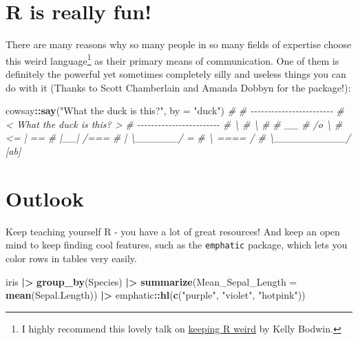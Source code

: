 \documentclass[
]{book}
\newenvironment{Shaded}{\begin{snugshade}}{\end{snugshade}}
\newcommand{\AttributeTok}[1]{\textcolor[rgb]{0.13,0.29,0.53}{#1}}
\newcommand{\CommentTok}[1]{\textcolor[rgb]{0.56,0.35,0.01}{\textit{#1}}}
\newcommand{\FunctionTok}[1]{\textcolor[rgb]{0.13,0.29,0.53}{\textbf{#1}}}
\newcommand{\NormalTok}[1]{#1}
\newcommand{\SpecialCharTok}[1]{\textcolor[rgb]{0.81,0.36,0.00}{\textbf{#1}}}
\newcommand{\StringTok}[1]{\textcolor[rgb]{0.31,0.60,0.02}{#1}}
\begin{document}
\section*{R is really fun!}\label{r-is-really-fun}

There are many reasons why so many people in so many fields of expertise choose this weird language\footnote{I highly recommend this lovely talk on \href{https://youtu.be/KOQBfC1WPwM?si=M_eStpWXBf56UGy7}{keeping R weird} by Kelly Bodwin.} as their primary means of communication.
One of them is definitely the powerful yet sometimes completely silly and useless things you can do with it (Thanks to Scott Chamberlain and Amanda Dobbyn for the package!):

\begin{Shaded}
\begin{Highlighting}[]
\NormalTok{cowsay}\SpecialCharTok{::}\FunctionTok{say}\NormalTok{(}\StringTok{"What the duck is this?"}\NormalTok{, }\AttributeTok{by =} \StringTok{"duck"}\NormalTok{)}
\CommentTok{\# }
\CommentTok{\#  {-}{-}{-}{-}{-}{-}{-}{-}{-}{-}{-}{-}{-}{-}{-}{-}{-}{-}{-}{-}{-}{-}{-}{-} }
\CommentTok{\# \textless{} What the duck is this? \textgreater{}}
\CommentTok{\#  {-}{-}{-}{-}{-}{-}{-}{-}{-}{-}{-}{-}{-}{-}{-}{-}{-}{-}{-}{-}{-}{-}{-}{-} }
\CommentTok{\#       \textbackslash{}}
\CommentTok{\#        \textbackslash{}}
\CommentTok{\# }
\CommentTok{\#          \_\_}
\CommentTok{\#         /o \textbackslash{}}
\CommentTok{\#       \textless{}=   |         ==}
\CommentTok{\#         |\_\_|        /===}
\CommentTok{\#         |   \textbackslash{}\_\_\_\_\_\_/  =}
\CommentTok{\#         \textbackslash{}     ====   /}
\CommentTok{\#          \textbackslash{}\_\_\_\_\_\_\_\_\_\_/     [ab]}
\end{Highlighting}
\end{Shaded}

\section*{Outlook}\label{outlook}

Keep teaching yourself R - you have a lot of great resources!
And keep an open mind to keep finding cool features, such as the \texttt{emphatic} package, which lets you color rows in tables very easily.

\begin{Shaded}
\begin{Highlighting}[]
\NormalTok{iris }\SpecialCharTok{|\textgreater{}} 
  \FunctionTok{group\_by}\NormalTok{(Species) }\SpecialCharTok{|\textgreater{}} 
  \FunctionTok{summarize}\NormalTok{(}\AttributeTok{Mean\_Sepal\_Length =} \FunctionTok{mean}\NormalTok{(Sepal.Length)) }\SpecialCharTok{|\textgreater{}} 
\NormalTok{  emphatic}\SpecialCharTok{::}\FunctionTok{hl}\NormalTok{(}\FunctionTok{c}\NormalTok{(}\StringTok{"purple"}\NormalTok{, }\StringTok{"violet"}\NormalTok{, }\StringTok{"hotpink"}\NormalTok{))}
\end{Highlighting}
\end{Shaded}
\end{document}
